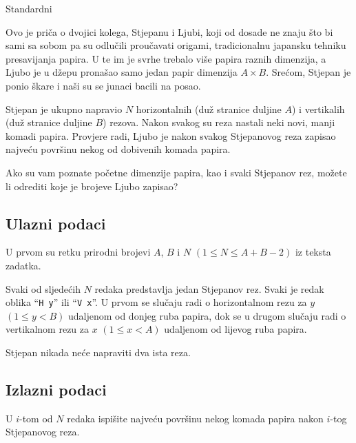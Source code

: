 \begin{statement}[
  problempoints=100,
  timelimit=3 sekunde,
  memorylimit=512 MiB,
]{Standardni}

Ovo je priča o dvojici kolega, Stjepanu i Ljubi, koji od dosade ne znaju što bi
sami sa sobom pa su odlučili proučavati origami, tradicionalnu japansku
tehniku presavijanja papira. U te im je svrhe trebalo više papira raznih
dimenzija, a Ljubo je u džepu pronašao samo jedan papir dimenzija $A\times B$.
Srećom, Stjepan je ponio škare i naši su se junaci bacili na posao.

Stjepan je ukupno napravio $N$ horizontalnih (duž stranice duljine $A$) i
vertikalih (duž stranice duljine $B$) rezova. Nakon svakog su reza nastali
neki novi, manji komadi papira.  Provjere radi, Ljubo je nakon svakog
Stjepanovog reza zapisao najveću površinu nekog od dobivenih komada papira.

Ako su vam poznate početne dimenzije papira, kao i svaki Stjepanov rez, možete
li odrediti koje je brojeve Ljubo zapisao?

\subsection*{Ulazni podaci}
U prvom su retku prirodni brojevi $A$, $B$ i $N$ $(1 \le N \le A + B - 2)$ iz
teksta zadatka.

Svaki od sljedećih $N$ redaka predstavlja jedan Stjepanov rez. Svaki je redak
oblika ``\texttt{H y}'' ili ``\texttt{V x}''. U prvom se slučaju radi o
horizontalnom rezu za $y$ $(1 \le y < B)$ udaljenom od donjeg ruba papira, dok
se u drugom slučaju radi o vertikalnom rezu za $x$ $(1 \le x < A)$ udaljenom
od lijevog ruba papira.

Stjepan nikada neće napraviti dva ista reza.

\subsection*{Izlazni podaci}
U $i$-tom od $N$ redaka ispišite najveću površinu nekog komada papira nakon
$i$-tog Stjepanovog reza.


\end{statement}
